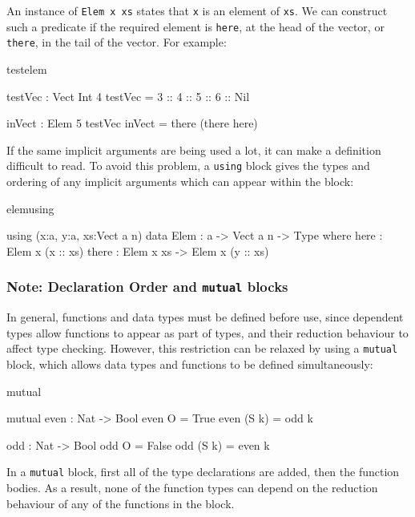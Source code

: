 \noindent
An instance of \texttt{Elem x xs} states that \texttt{x} is an element of 
\texttt{xs}. We can construct
such a predicate if the required element is \texttt{here}, at the head of the vector, 
or \texttt{there}, in the tail of the vector. For example:

\begin{SaveVerbatim}{testelem}

testVec : Vect Int 4
testVec = 3 :: 4 :: 5 :: 6 :: Nil

inVect : Elem 5 testVec
inVect = there (there here)

\end{SaveVerbatim}

\noindent
If the same implicit arguments are being used a lot, it can make a definition
difficult to read. To avoid this problem, a \texttt{using} block gives the types and
ordering of any implicit arguments which can appear within the block:

\begin{SaveVerbatim}{elemusing}

using (x:a, y:a, xs:Vect a n)
  data Elem : a -> Vect a n -> Type where
     here  : Elem x (x :: xs)
     there : Elem x xs -> Elem x (y :: xs)

\end{SaveVerbatim}

\subsubsection*{Note: Declaration Order and \texttt{mutual} blocks}

In general, functions and data types must be defined before use, since
dependent types allow functions to appear as part of types, and their
reduction behaviour to affect type checking. However, this
restriction can be relaxed by using a \texttt{mutual} block, which allows
data types and functions to be defined simultaneously:

\begin{SaveVerbatim}{mutual}

mutual
  even : Nat -> Bool
  even O = True
  even (S k) = odd k

  odd : Nat -> Bool
  odd O = False
  odd (S k) = even k

\end{SaveVerbatim}

\noindent
In a \texttt{mutual} block, first all of the type declarations are added,
then the function bodies. As a result, none of the function types can depend
on the reduction behaviour of any of the functions in the block.

